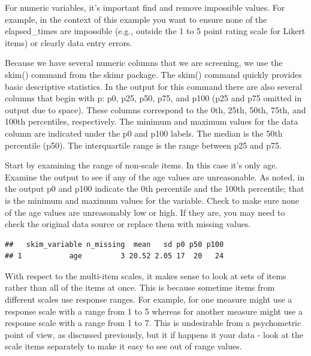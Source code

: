 \documentclass[
]{krantz}
\makeatletter
\newenvironment{Shaded}{\begin{snugshade}}{\end{snugshade}}
\newcommand{\KeywordTok}[1]{\textcolor[rgb]{0.27,0.27,0.27}{\textbf{#1}}}
\newcommand{\NormalTok}[1]{#1}
\newcommand{\OperatorTok}[1]{\textcolor[rgb]{0.43,0.43,0.43}{\textbf{#1}}}
\newcommand{\StringTok}[1]{\textcolor[rgb]{0.5,0.5,0.5}{#1}}
\newenvironment{kframe}{%
\medskip{}
\setlength{\fboxsep}{.8em}
 \def\at@end@of@kframe{}%
 \ifinner\ifhmode%
  \def\at@end@of@kframe{\end{minipage}}%
  \begin{minipage}{\columnwidth}%
 \fi\fi%
 \def\FrameCommand##1{\hskip\@totalleftmargin \hskip-\fboxsep
 \colorbox{shadecolor}{##1}\hskip-\fboxsep
     \hskip-\linewidth \hskip-\@totalleftmargin \hskip\columnwidth}%
 \MakeFramed {\advance\hsize-\width
   \@totalleftmargin\z@ \linewidth\hsize
   \@setminipage}}%
 {\par\unskip\endMakeFramed%
 \at@end@of@kframe}
\renewenvironment{Shaded}{\begin{kframe}}{\end{kframe}}
\makeatother
\begin{document}
For numeric variables, it's important find and remove impossible values. For example, in the context of this example you want to ensure none of the elapsed\_times are impossible (e.g., outside the 1 to 5 point rating scale for Likert items) or clearly data entry errors.

Because we have several numeric columns that we are screening, we use the skim() command from the skimr package. The skim() command quickly provides basic descriptive statistics. In the output for this command there are also several columns that begin with p: p0, p25, p50, p75, and p100 (p25 and p75 omitted in output due to space). These columns correspond to the 0th, 25th, 50th, 75th, and 100th percentiles, respectively. The minimum and maximum values for the data column are indicated under the p0 and p100 labels. The median is the 50th percentile (p50). The interquartile range is the range between p25 and p75.

Start by examining the range of non-scale items. In this case it's only age. Examine the output to see if any of the age values are unreasonable. As noted, in the output p0 and p100 indicate the 0th percentile and the 100th percentile; that is the minimum and maximum values for the variable. Check to make sure none of the age values are unreasonably low or high. If they are, you may need to check the original data source or replace them with missing values.

\begin{Shaded}
\end{Shaded}

\begin{verbatim}
##   skim_variable n_missing  mean   sd p0 p50 p100
## 1           age         3 20.52 2.05 17  20   24
\end{verbatim}

With respect to the multi-item scales, it makes sense to look at sets of items rather than all of the items at once. This is because sometime items from different scales use response ranges. For example, for one measure might use a response scale with a range from 1 to 5 whereas for another measure might use a response scale with a range from 1 to 7. This is undesirable from a psychometric point of view, as discussed previously, but it if happens it your data - look at the scale items separately to make it easy to see out of range values.
\end{document}
